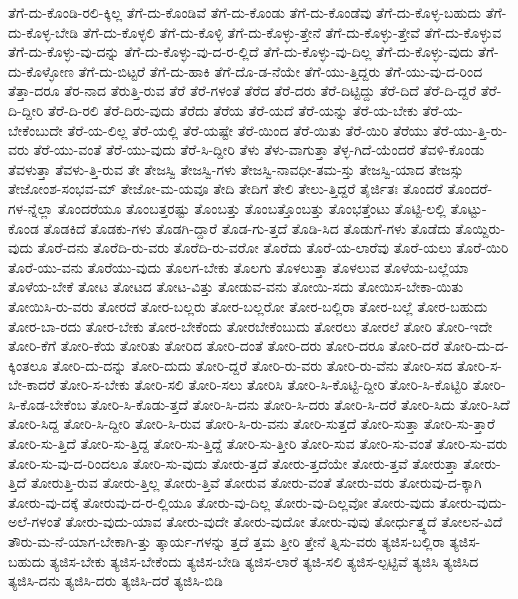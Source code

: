 {ತೆಗೆ-ದು-ಕೊಂಡಿ-ರಲಿ-ಕ್ಕಿಲ್ಲ
ತೆಗೆ-ದು-ಕೊಂಡಿವೆ
ತೆಗೆ-ದು-ಕೊಂಡು
ತೆಗೆ-ದು-ಕೊಂಡೆವು
ತೆಗೆ-ದು-ಕೊಳ್ಳ-ಬಹುದು
ತೆಗೆ-ದು-ಕೊಳ್ಳ-ಬೇಡಿ
ತೆಗೆ-ದು-ಕೊಳ್ಳಲಿ
ತೆಗೆ-ದು-ಕೊಳ್ಳಿ
ತೆಗೆ-ದು-ಕೊಳ್ಳು-ತ್ತೇನೆ
ತೆಗೆ-ದು-ಕೊಳ್ಳು-ತ್ತೇವೆ
ತೆಗೆ-ದು-ಕೊಳ್ಳುವ
ತೆಗೆ-ದು-ಕೊಳ್ಳು-ವು-ದನ್ನು
ತೆಗೆ-ದು-ಕೊಳ್ಳು-ವು-ದ-ರ-ಲ್ಲಿದೆ
ತೆಗೆ-ದು-ಕೊಳ್ಳು-ವು-ದಿಲ್ಲ
ತೆಗೆ-ದು-ಕೊಳ್ಳು-ವುದು
ತೆಗೆ-ದು-ಕೊಳ್ಳೋಣ
ತೆಗೆ-ದು-ಬಿಟ್ಟರೆ
ತೆಗೆ-ದು-ಹಾಕಿ
ತೆಗೆ-ದೊ-ಡ-ನೆಯೇ
ತೆಗೆ-ಯು-ತ್ತಿದ್ದರು
ತೆಗೆ-ಯು-ವು-ದ-ರಿಂದ
ತೆತ್ತಾ-ದರೂ
ತೆರ-ನಾದ
ತೆರುತ್ತಿ-ರುವ
ತೆರೆ
ತೆರೆ-ಗಳಂತೆ
ತೆರೆದ
ತೆರೆ-ದರು
ತೆರೆ-ದಿಟ್ಟಿದ್ದು
ತೆರೆ-ದಿದೆ
ತೆರೆ-ದಿ-ದ್ದರೆ
ತೆರೆ-ದಿ-ದ್ದೀರಿ
ತೆರೆ-ದಿ-ರಲಿ
ತೆರೆ-ದಿರು-ವುದು
ತೆರೆದು
ತೆರೆಯ
ತೆರೆ-ಯದೆ
ತೆರೆ-ಯನ್ನು
ತೆರೆ-ಯ-ಬೇಕು
ತೆರೆ-ಯ-ಬೇಕೆಂಬುದೇ
ತೆರೆ-ಯ-ಲಿಲ್ಲ
ತೆರೆ-ಯಲ್ಲಿ
ತೆರೆ-ಯಷ್ಟೇ
ತೆರೆ-ಯಿಂದ
ತೆರೆ-ಯಿತು
ತೆರೆ-ಯಿರಿ
ತೆರೆಯು
ತೆರೆ-ಯು-ತ್ತಿ-ರು-ವರು
ತೆರೆ-ಯು-ವಂತೆ
ತೆರೆ-ಯು-ವುದು
ತೆರೆ-ಸಿ-ದ್ದೀರಿ
ತೆಳು
ತೆಳು-ವಾಗುತ್ತಾ
ತೆಳ್ಳ-ಗಿದೆ-ಯೆಂದರೆ
ತೆವಳಿ-ಕೊಂಡು
ತೆವಳುತ್ತಾ
ತೆವಳು-ತ್ತಿ-ರುವ
ತೇ
ತೇಜಸ್ವಿ
ತೇಜಸ್ವಿ-ಗಳು
ತೇಜಸ್ವಿ-ನಾವಧೀ-ತಮ-ಸ್ತು
ತೇಜಸ್ವಿ-ಯಾದ
ತೇಜಸ್ಸು
ತೇಜೋಂಶ-ಸಂಭವ-ಮ್
ತೇಜೋ-ಮ-ಯವೂ
ತೇದಿ
ತೇದಿಗೆ
ತೇಲಿ
ತೇಲು-ತ್ತಿದ್ದರೆ
ತೈರ್ಜಿತಃ
ತೊಂದರೆ
ತೊಂದರೆ-ಗಳ-ನ್ನೆಲ್ಲಾ
ತೊಂದರೆಯೂ
ತೊಂಬತ್ತರಷ್ಟು
ತೊಂಬತ್ತು
ತೊಂಬತ್ತೊಂಬತ್ತು
ತೊಂಭತ್ತೆಂಟು
ತೊಟ್ಟಿ-ಲಲ್ಲಿ
ತೊಟ್ಟು-ಕೊಂಡ
ತೊಡಕಿದೆ
ತೊಡಕು-ಗಳು
ತೊಡಗಿ-ದ್ದಾರೆ
ತೊಡ-ಗು-ತ್ತದೆ
ತೊಡಿ-ಸಿದ
ತೊಡುಗೆ-ಗಳು
ತೊಡೆದು
ತೊಯ್ದಿರು-ವುದು
ತೊರೆ-ದನು
ತೊರೆದಿ-ರು-ವರು
ತೊರೆದಿ-ರು-ವರೋ
ತೊರೆದು
ತೊರೆ-ಯ-ಲಾರೆವು
ತೊರೆ-ಯಲು
ತೊರೆ-ಯಿರಿ
ತೊರೆ-ಯು-ವನು
ತೊರೆಯು-ವುದು
ತೊಲಗ-ಬೇಕು
ತೊಲಗು
ತೊಳಲುತ್ತಾ
ತೊಳಲುವ
ತೊಳೆಯ-ಬಲ್ಲೆಯಾ
ತೊಳೆಯ-ಬೇಕೆ
ತೋಟ
ತೋಟದ
ತೋಟ-ವಿತ್ತು
ತೋಡುವ-ವನು
ತೋಯಿ-ಸದು
ತೋಯಿಸ-ಬೇಕಾ-ಯಿತು
ತೋಯಿಸಿ-ರು-ವರು
ತೋರದೆ
ತೋರ-ಬಲ್ಲರು
ತೋರ-ಬಲ್ಲರೋ
ತೋರ-ಬಲ್ಲಿರಾ
ತೋರ-ಬಲ್ಲೆ
ತೋರ-ಬಹುದು
ತೋರ-ಬಾ-ರದು
ತೋರ-ಬೇಕು
ತೋರ-ಬೇಕೆಂದು
ತೋರಬೇಕೆಂಬುದು
ತೋರಲು
ತೋರಲೆ
ತೋರಿ
ತೋರಿ-ಇದೇ
ತೋರಿ-ಕೆಗೆ
ತೋರಿ-ಕೆಯ
ತೋರಿತು
ತೋರಿದ
ತೋರಿ-ದಂತೆ
ತೋರಿ-ದರು
ತೋರಿ-ದರೂ
ತೋರಿ-ದರೆ
ತೋರಿ-ದು-ದ-ಕ್ಕಿಂತಲೂ
ತೋರಿ-ದು-ದನ್ನು
ತೋರಿ-ದುದು
ತೋರಿ-ದ್ದರೆ
ತೋರಿ-ರು-ವರು
ತೋರಿ-ರು-ವೆನು
ತೋರಿ-ಸದ
ತೋರಿ-ಸ-ಬೇ-ಕಾದರೆ
ತೋರಿ-ಸ-ಬೇಕು
ತೋರಿ-ಸಲಿ
ತೋರಿ-ಸಲು
ತೋರಿಸಿ
ತೋರಿ-ಸಿ-ಕೊಟ್ಟಿ-ದ್ದೀರಿ
ತೋರಿ-ಸಿ-ಕೊಟ್ಟಿರಿ
ತೋರಿ-ಸಿ-ಕೊಡ-ಬೇಕೆಂಬ
ತೋರಿ-ಸಿ-ಕೊಡು-ತ್ತದೆ
ತೋರಿ-ಸಿ-ದನು
ತೋರಿ-ಸಿ-ದರು
ತೋರಿ-ಸಿ-ದರೆ
ತೋರಿ-ಸಿದು
ತೋರಿ-ಸಿದೆ
ತೋರಿ-ಸಿದ್ದ
ತೋರಿ-ಸಿ-ದ್ದೀರಿ
ತೋರಿ-ಸಿ-ರುವ
ತೋರಿ-ಸಿ-ರು-ವನು
ತೋರಿ-ಸುತ್ತದೆ
ತೋರಿ-ಸುತ್ತಾ
ತೋರಿ-ಸು-ತ್ತಾರೆ
ತೋರಿ-ಸು-ತ್ತಿದೆ
ತೋರಿ-ಸು-ತ್ತಿದ್ದ
ತೋರಿ-ಸು-ತ್ತಿದ್ದೆ
ತೋರಿ-ಸು-ತ್ತೀರಿ
ತೋರಿ-ಸುವ
ತೋರಿ-ಸು-ವಂತೆ
ತೋರಿ-ಸು-ವರು
ತೋರಿ-ಸು-ವು-ದ-ರಿಂದಲೂ
ತೋರಿ-ಸು-ವುದು
ತೋರು-ತ್ತದೆ
ತೋರು-ತ್ತದೆಯೇ
ತೋರು-ತ್ತವೆ
ತೋರುತ್ತಾ
ತೋರು-ತ್ತಿದೆ
ತೋರುತ್ತಿ-ರುವ
ತೋರು-ತ್ತಿಲ್ಲ
ತೋರು-ತ್ತಿವೆ
ತೋರುವ
ತೋರು-ವಂತೆ
ತೋರು-ವರು
ತೋರುವು-ದ-ಕ್ಕಾಗಿ
ತೋರು-ವು-ದಕ್ಕೆ
ತೋರುವು-ದ-ರ-ಲ್ಲಿಯೂ
ತೋರು-ವು-ದಿಲ್ಲ
ತೋರು-ವು-ದಿಲ್ಲವೋ
ತೋರು-ವುದು
ತೋರು-ವುದು-ಅಲೆ-ಗಳಂತೆ
ತೋರು-ವುದು-ಯಾವ
ತೋರು-ವುದೇ
ತೋರು-ವುದೋ
ತೋರು-ವುವು
ತೋರ್ಧುತ್ತ್ಧದೆ
ತೋಲನ-ವಿದೆ
ತೌರು-ಮ-ನೆ-ಯಾಗ-ಬೇಕಾಗಿ-ತ್ತು
ತ್ಕಾರ್ಯ-ಗಳನ್ನು
ತ್ತದೆ
ತ್ತಮ
ತ್ತೀರಿ
ತ್ತೇನೆ
ತ್ನಿಸು-ವರು
ತ್ಯಜಿಸ-ಬಲ್ಲಿರಾ
ತ್ಯಜಿಸ-ಬಹುದು
ತ್ಯಜಿಸ-ಬೇಕು
ತ್ಯಜಿಸ-ಬೇಕೆಂದು
ತ್ಯಜಿಸ-ಬೇಡಿ
ತ್ಯಜಿಸ-ಲಾರೆ
ತ್ಯಜಿ-ಸಲಿ
ತ್ಯಜಿಸ-ಲ್ಪಟ್ಟಿವೆ
ತ್ಯಜಿಸಿ
ತ್ಯಜಿಸಿದ
ತ್ಯಜಿಸಿ-ದನು
ತ್ಯಜಿಸಿ-ದರು
ತ್ಯಜಿಸಿ-ದರೆ
ತ್ಯಜಿಸಿ-ಬಿಡಿ
}
